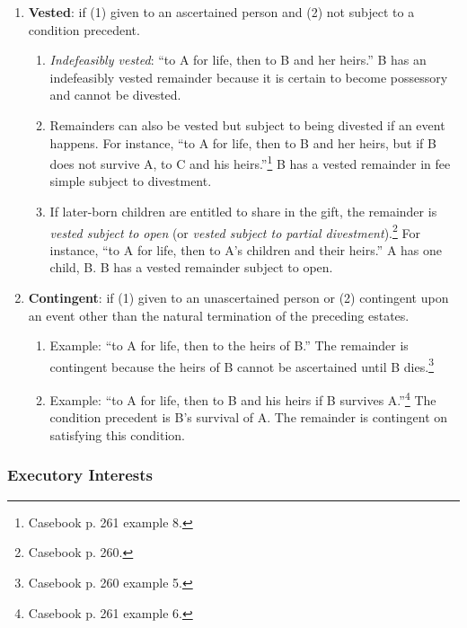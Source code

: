 \begin{enumerate}
    \item \textbf{Vested}: if (1) given to an ascertained person and (2) not 
    subject to a condition precedent.
    \begin{enumerate}
        \item \emph{Indefeasibly vested}:  ``to A for life, then to B and her 
        heirs.'' B has an indefeasibly vested remainder because it is certain 
        to become possessory and cannot be divested.
        \item Remainders can also be vested but subject to being divested if 
        an event happens. For instance, ``to A for life, then to B and her 
        heirs, but if B does not survive A, to C and his 
        heirs.''\footnote{Casebook p. 261 example 8.} B has a vested remainder 
        in fee simple subject to divestment.
        \item If later-born children are entitled to share in the gift, the 
        remainder is \emph{vested subject to open} (or \emph{vested subject to 
        partial divestment}).\footnote{Casebook p. 260.} For instance, ``to A 
        for life, then to A's children and their heirs.'' A has one child, B. 
        B has a vested remainder subject to open.
    \end{enumerate}
    \item \textbf{Contingent}: if (1) given to an unascertained person or (2) 
    contingent upon an event other than the natural termination of the 
    preceding estates.
    \begin{enumerate}
        \item Example: ``to A for life, then to the heirs of B.'' The 
        remainder is contingent because the heirs of B cannot be ascertained 
        until B dies.\footnote{Casebook p. 260 example 5.}
        \item Example: ``to A for life, then to B and his heirs if B survives 
        A.''\footnote{Casebook p. 261 example 6.} The condition precedent is 
        B's survival of A. The remainder is contingent on satisfying this 
        condition.
    \end{enumerate}
\end{enumerate}

\subsubsection{Executory Interests}

